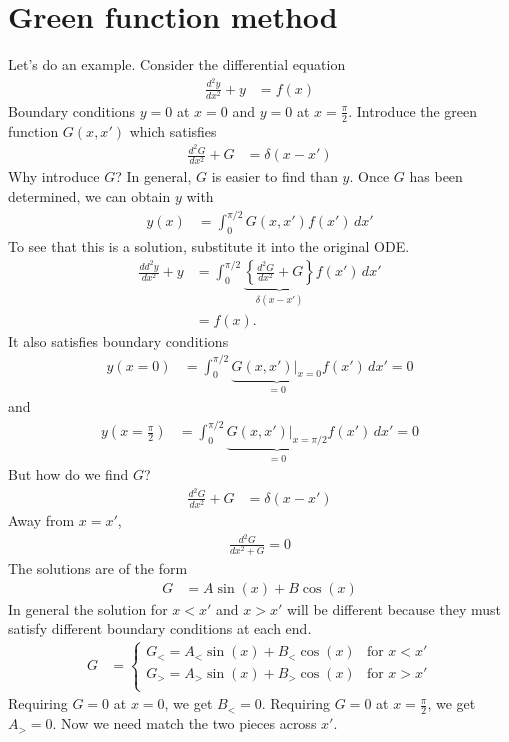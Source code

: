 \section{Green function method}
Let's do an example.
Consider the differential equation
\begin{align}
    \frac{d^2y}{dx^2} + y &= f(x)
\end{align}
Boundary conditions $y=0$ at $x=0$
and $y=0$ at $x=\frac{\pi}{2}$.
Introduce the green function $G(x, x')$ which satisfies
\begin{align}
    \frac{d^2 G}{dx^2} + G &=
    \delta\left( x - x' \right)
\end{align}
Why introduce $G$?
In general,
$G$ is easier to find than $y$.
Once $G$ has been determined,
we can obtain $y$ with
\begin{align}
    y(x) &=
    \int_{0}^{\pi/2}
    G\left( x, x' \right)
    f\left( x' \right)\,
    dx'
\end{align}
To see that this is a solution,
substitute it into the original ODE.
\begin{align}
    \frac{dd^2 y}{dx^2} + y
    &=
    \int_{0}^{\pi/2}
    \underbrace{\left\{ 
    \frac{d^2 G}{dx^2} + G
    \right\}}_{
    \delta\left( x - x' \right)
    }
    f\left( x' \right)
    \,dx'\\
    &=
    f(x).
\end{align}
It also satisfies boundary conditions
\begin{align}
    y(x=0) &=
    \int_{0}^{\pi/2}
    \underbrace{\left.G\left( x, x' \right)\right|_{x=0}}_{=0}
    f\left( x' \right)\,dx' = 0
\end{align}
and
\begin{align}
    y\left( x=\frac{\pi}{2} \right)
    &=
    \int_{0}^{\pi/2}
    \underbrace{\left.G\left( x, x' \right)\right|_{x=\pi/2}}_{=0}
    f\left( x' \right)
    \,dx'
    =0
\end{align}
But how do we find $G$?
\begin{align}
    \frac{d^2G}{dx^2} + G &= \delta\left( x - x' \right)
\end{align}
Away from $x=x'$,
\begin{align}
    \frac{d^2 G}{dx^2 + G} = 0
\end{align}
The solutions are of the form
\begin{align}
    G &=
    A\sin(x) + B\cos(x)
\end{align}
In general the solution for $x<x'$ and $x>x'$ will be different
because they must satisfy different boundary conditions at each end.
\begin{align}
    G &=
    \begin{cases}
        G_{<} = A_{<}\sin(x) + B_{<}\cos(x) & \text{for } x < x'\\
        G_{>} = A_{>}\sin(x) + B_{>}\cos(x) & \text{for } x > x'\\
    \end{cases}
\end{align}
Requiring $G=0$ at $x=0$,
we get $B_{<}=0$.
Requiring $G=0$ at $x=\frac{\pi}{2}$,
we get $A_{>}=0$.
Now we need match the two pieces across $x'$.

